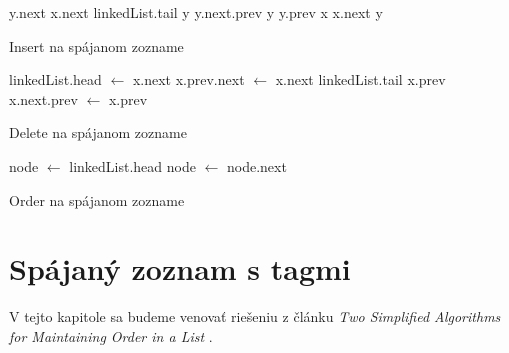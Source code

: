 \documentclass[
  digital,     %
  oneside,     %
  nosansbold,  %
  nocolorbold, %
  lof,         %
  lot,         %
]{fithesis4}
\begin{document}
\begin{algorithm}
\hline\vspace{0.2em}
y.next \leftarrow x.next\;
{
    linkedList.tail \leftarrow y\;
}
\Else
{
    y.next.prev \leftarrow y\;
}
y.prev \leftarrow x\;
x.next \leftarrow y\;
\caption{Insert na spájanom zozname}
\end{algorithm}

\begin{algorithm}
\hline\vspace{0.2em}
{
    linkedList.head $\leftarrow$ x.next\;
}
\Else
{
    x.prev.next $\leftarrow$ x.next\;
}
{
    linkedList.tail \leftarrow x.prev\;
}
\Else
{
    x.next.prev $\leftarrow$ x.prev\;
}
\caption{Delete na spájanom zozname}
\end{algorithm}

\begin{algorithm}
\hline\vspace{0.2em}
node $\leftarrow$ linkedList.head\;
{
    {
        \;
    }
    {
        \;
    }
    node $\leftarrow$ node.next\;
}
\caption{Order na spájanom zozname}
\end{algorithm}


\chapter{Spájaný zoznam s tagmi}

V tejto kapitole sa budeme venovať riešeniu z článku \textit{Two Simplified Algorithms for Maintaining Order in a List} \cite{paper1_ordered_list}.
\end{document}
